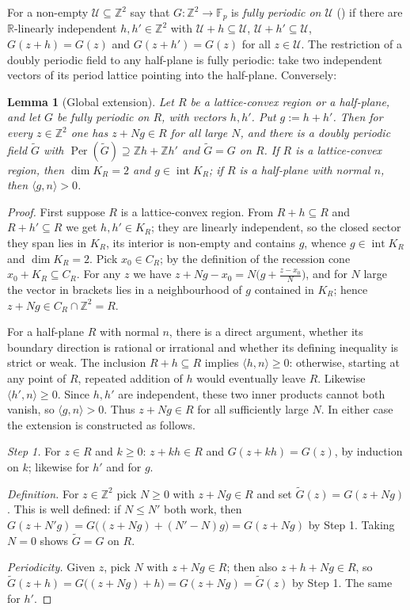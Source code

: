 \documentclass[11pt,reqno]{amsart}
\theoremstyle{plain}
\newtheorem{lem}[thm]{Lemma}
\theoremstyle{definition}
\theoremstyle{remark}
\theoremstyle{plain}
\theoremstyle{remark}
\theoremstyle{definition}
\numberwithin{equation}{section}
\DeclareMathOperator{\Per}{Per}
\newcommand{\R}{\mathbb{R}}
\newcommand{\Z}{\mathbb{Z}}
\newcommand{\Fp}{\mathbb{F}_p}
\newcommand{\cU}{\mathcal{U}}
\begin{document}
For a non-empty $\cU\subseteq\Z^2$ say that $G\colon\Z^2\to\Fp$ is \emph{fully
periodic on $\cU$} (\cite[Definition~2.1]{CG}) if
there are $\R$-linearly independent $h,h'\in\Z^2$ with $\cU+h\subseteq\cU$,
$\cU+h'\subseteq\cU$, $G(z+h)=G(z)$ and $G(z+h')=G(z)$ for all $z\in\cU$.  The
restriction of a doubly periodic field to any half-plane is fully periodic: take
two independent vectors of its period lattice pointing into the half-plane.
Conversely:

\begin{lem}[Global extension]\label{lem:extend}
Let $R$ be a lattice-convex region or a half-plane, and let $G$ be fully periodic
on $R$, with vectors $h,h'$.  Put $g:=h+h'$.  Then for every $z\in\Z^2$ one
has $z+Ng\in R$ for all large $N$, and there is a doubly
periodic field $\widetilde G$ with $\Per(\widetilde G)\supseteq\Z h+\Z h'$ and
$\widetilde G=G$ on $R$.  If $R$ is a lattice-convex region, then
$\dim K_R=2$ and $g\in\operatorname{int}K_R$; if $R$ is a half-plane with
normal $n$, then $\langle g,n\rangle>0$.
\end{lem}

\begin{proof}
First suppose $R$ is a lattice-convex region.  From $R+h\subseteq R$ and
$R+h'\subseteq R$ we get $h,h'\in K_R$; they are
linearly independent, so the closed sector they span lies in $K_R$, its interior
is non-empty and contains $g$, whence $g\in\operatorname{int}K_R$ and
$\dim K_R=2$.  Pick $x_0\in C_R$; by the definition of the recession cone
$x_0+K_R\subseteq C_R$.  For any $z$ we have
$z+Ng-x_0=N\bigl(g+\tfrac{z-x_0}{N}\bigr)$, and for $N$ large the vector in
brackets lies in a neighbourhood of $g$ contained in $K_R$; hence
$z+Ng\in C_R\cap\Z^2=R$.

For a half-plane $R$ with normal $n$, there is a direct argument, whether its
boundary direction is rational or irrational and whether its defining
inequality is strict or weak.  The inclusion $R+h\subseteq R$ implies
$\langle h,n\rangle\ge0$: otherwise, starting at any point of $R$, repeated
addition of $h$ would eventually leave $R$.  Likewise
$\langle h',n\rangle\ge0$.  Since $h,h'$ are independent, these two inner
products cannot both vanish, so $\langle g,n\rangle>0$.  Thus $z+Ng\in R$ for
all sufficiently large $N$.  In either case the extension is constructed as
follows.

\emph{Step 1.}  For $z\in R$ and $k\ge0$: $z+kh\in R$ and $G(z+kh)=G(z)$, by
induction on $k$; likewise for $h'$ and for $g$.

\emph{Definition.}  For $z\in\Z^2$ pick $N\ge0$ with $z+Ng\in R$ and set
$\widetilde G(z)=G(z+Ng)$.  This is well defined: if $N\le N'$ both work, then
$G(z+N'g)=G\bigl((z+Ng)+(N'-N)g\bigr)=G(z+Ng)$ by Step 1.  Taking $N=0$ shows
$\widetilde G=G$ on $R$.

\emph{Periodicity.}  Given $z$, pick $N$ with $z+Ng\in R$; then also
$z+h+Ng\in R$, so
$\widetilde G(z+h)=G\bigl((z+Ng)+h\bigr)=G(z+Ng)=\widetilde G(z)$ by Step 1.
The same for $h'$.
\end{proof}
\end{document}
